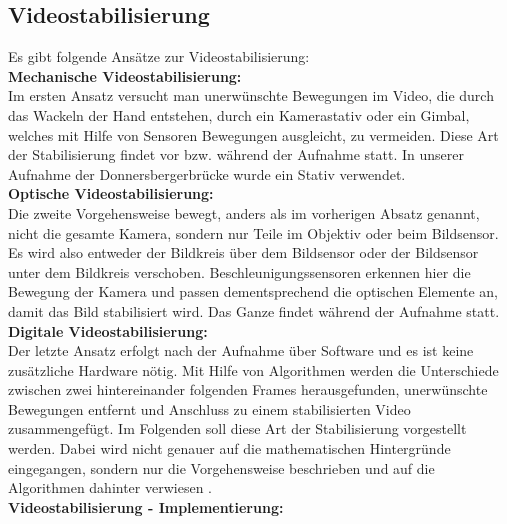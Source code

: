 \documentclass[conference]{IEEEtran}
\begin{document}
	\subsection{Videostabilisierung}
	Es gibt folgende Ansätze zur Videostabilisierung:\\
	\textbf{Mechanische Videostabilisierung:}\\
	Im ersten Ansatz versucht man unerwünschte Bewegungen im Video, die durch das Wackeln der Hand entstehen, durch ein Kamerastativ oder ein Gimbal, welches mit Hilfe von Sensoren Bewegungen ausgleicht, zu vermeiden. Diese Art der Stabilisierung findet vor bzw. während der Aufnahme statt.
	In unserer Aufnahme der Donnersbergerbrücke wurde ein Stativ verwendet.\\
	\textbf{Optische Videostabilisierung:}\\
	Die zweite Vorgehensweise bewegt, anders als im vorherigen Absatz genannt, nicht die gesamte Kamera, sondern nur Teile im Objektiv oder beim Bildsensor. Es wird also entweder der Bildkreis über dem Bildsensor oder der Bildsensor unter dem Bildkreis verschoben. Beschleunigungssensoren erkennen hier die Bewegung der Kamera und passen dementsprechend die optischen Elemente an, damit das Bild stabilisiert wird. Das Ganze findet während der Aufnahme statt.\\
	\textbf{Digitale Videostabilisierung:}\\
	Der letzte Ansatz erfolgt nach der Aufnahme über Software und es ist keine zusätzliche Hardware nötig. Mit Hilfe von Algorithmen werden die Unterschiede zwischen zwei hintereinander folgenden Frames herausgefunden, unerwünschte Bewegungen entfernt und Anschluss zu einem stabilisierten Video zusammengefügt. Im Folgenden soll diese Art der Stabilisierung vorgestellt werden.
	Dabei wird nicht genauer auf die mathematischen Hintergründe eingegangen, sondern nur die Vorgehensweise beschrieben und auf die Algorithmen dahinter verwiesen \cite{s1}\cite{stab}.\\
	\textbf{Videostabilisierung - Implementierung:}
\end{document}
